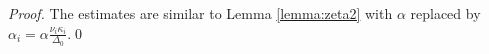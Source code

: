 \documentclass[a4paper]{article}
\theoremstyle{plain}
\newtheorem{lemma}[theorem]{Lemma}
\theoremstyle{definition}
\newcommand{\N}{\mathbb{N}}
\begin{document}
\textit{Proof.} 
The estimates are similar to Lemma \ref{lemma:zeta2} with $\alpha$ replaced by $\alpha_i = \alpha\frac{\nu_i\kappa_i}{\Delta_0}$.\qed

\end{document}
